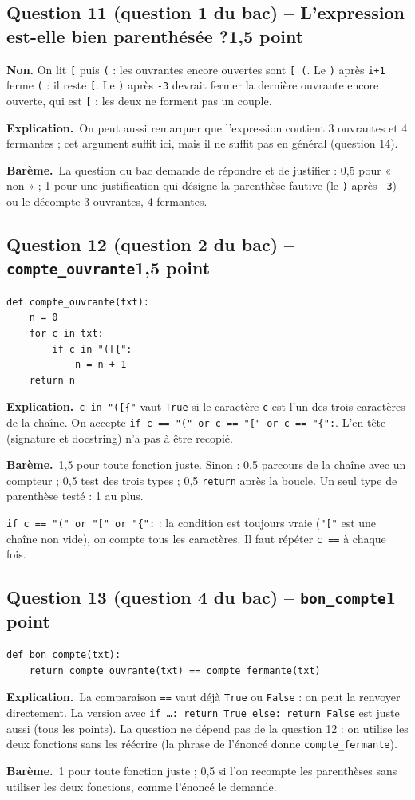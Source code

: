 \documentclass[11pt, a4paper]{exam}
\newcommand{\code}[1]{\texttt{#1}}
\newcommand{\Qt}[2]{\par\needspace{10\baselineskip}\subsection*{#1\hfill{\normalfont\small #2}}}
\newcommand{\bareme}[1]{\par\noindent\textbf{Barème.}\ #1\par\smallskip}
\newcommand{\explication}{\noindent\textbf{Explication.}\ }
\begin{document}
\Qt{Question 11 (question 1 du bac) -- L'expression est-elle bien parenthésée ?}{1,5 point}
\begin{reponse}
\textbf{Non.} On lit \code{[} puis \code{(} : les ouvrantes encore ouvertes sont \code{[ (}. Le \code{)} après \code{i+1} ferme \code{(} : il reste \code{[}. Le \code{)} après \code{-3} devrait fermer la dernière ouvrante encore ouverte, qui est \code{[} : les deux ne forment pas un couple.
\end{reponse}
\explication On peut aussi remarquer que l'expression contient 3 ouvrantes et 4 fermantes ; cet argument suffit ici, mais il ne suffit pas en général (question 14).
\bareme{La question du bac demande de répondre et de justifier : 0,5 pour « non » ; 1 pour une justification qui désigne la parenthèse fautive (le \code{)} après \code{-3}) ou le décompte 3 ouvrantes, 4 fermantes.}

\Qt{Question 12 (question 2 du bac) -- \code{compte\_ouvrante}}{1,5 point}
\begin{reponse}
\begin{lstlisting}
def compte_ouvrante(txt):
    n = 0
    for c in txt:
        if c in "([{":
            n = n + 1
    return n
\end{lstlisting}
\end{reponse}
\explication \code{c in "([\{"} vaut \code{True} si le caractère \code{c} est l'un des trois caractères de la chaîne. On accepte \code{if c == "(" or c == "[" or c == "\{":}. L'en-tête (signature et docstring) n'a pas à être recopié.
\bareme{1,5 pour toute fonction juste. Sinon : 0,5 parcours de la chaîne avec un compteur ; 0,5 test des trois types ; 0,5 \code{return} après la boucle. Un seul type de parenthèse testé : 1 au plus.}
\begin{erreur}
\code{if c == "(" or "[" or "\{":} : la condition est toujours vraie (\code{"["} est une chaîne non vide), on compte tous les caractères. Il faut répéter \code{c ==} à chaque fois.
\end{erreur}

\Qt{Question 13 (question 4 du bac) -- \code{bon\_compte}}{1 point}
\begin{reponse}
\begin{lstlisting}
def bon_compte(txt):
    return compte_ouvrante(txt) == compte_fermante(txt)
\end{lstlisting}
\end{reponse}
\explication La comparaison \code{==} vaut déjà \code{True} ou \code{False} : on peut la renvoyer directement. La version avec \code{if \ldots: return True else: return False} est juste aussi (tous les points). La question ne dépend pas de la question 12 : on utilise les deux fonctions sans les réécrire (la phrase de l'énoncé donne \code{compte\_fermante}).
\bareme{1 pour toute fonction juste ; 0,5 si l'on recompte les parenthèses sans utiliser les deux fonctions, comme l'énoncé le demande.}
\end{document}
